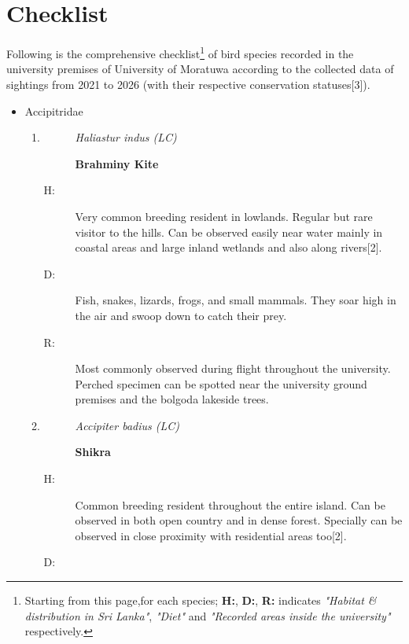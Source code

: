 \chapter{Checklist}
\label{cp:checklist}
Following is the comprehensive checklist\footnote{Starting from this page,for each species; \textbf{H:}, \textbf{D:}, \textbf{R:} indicates \textit{"Habitat \& distribution in Sri Lanka"}, \textit{"Diet"} and \textit{"Recorded areas inside the university"} respectively.} of bird species recorded in the university premises of University of Moratuwa according to the collected data of sightings from 2021 to 2026 (with their respective conservation statuses[3]).

\begin{itemize}%
\item%
 Accipitridae%
\begin{enumerate}%
\item%
\begin{description}%
\item[]%
\textit{Haliastur indus (LC)}%
\item[]%
\textbf{Brahminy Kite}%
\end{description}%
\begin{description}%
\item[H: ]%
Very common breeding resident in lowlands. Regular but rare visitor to the hills. Can be observed easily near water mainly in coastal areas and large inland wetlands and also along rivers{[}2{]}.%
\item[D: ]%
Fish, snakes, lizards, frogs, and small mammals. They soar high in the air and swoop down to catch their prey.%
\item[R: ]%
Most commonly observed during flight throughout the university. Perched specimen can be spotted near the university ground premises and the bolgoda lakeside trees.%
\end{description}%
\item%
\begin{description}%
\item[]%
\textit{Accipiter badius (LC)}%
\item[]%
\textbf{Shikra}%
\end{description}%
\begin{description}%
\item[H: ]%
Common breeding resident throughout the entire island. Can be observed in both open country and in dense forest. Specially can be observed in close proximity with residential areas too{[}2{]}.%
\item[D: ]%

\end{description}
\end{enumerate}
\end{itemize}
